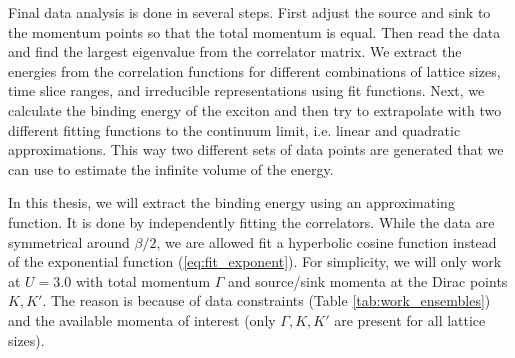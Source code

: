 
Final data analysis is done in several steps. First adjust the source and sink to the momentum points so that the total momentum is equal. Then read the data and find the largest eigenvalue from the correlator matrix. We extract the energies from the correlation functions for different combinations of lattice sizes, time slice ranges, and irreducible representations using fit functions. Next, we calculate the binding energy of the exciton and then try to extrapolate with two different fitting functions to the continuum limit, i.e. linear and quadratic approximations. This way two different sets of data points are generated that we can use to estimate the infinite volume of the energy.

In this thesis, we will extract the binding energy using an approximating function. It is done by independently fitting the correlators. While the data are symmetrical around $\beta/2$, we are allowed fit a hyperbolic cosine function instead of the exponential function (\ref{eq:fit_exponent}). For simplicity, we will only work at $U = 3.0$ with total momentum $\Gamma$ and source/sink momenta at the Dirac points $K, K'$. The reason is because of data constraints (Table \ref{tab:work_ensembles}) and the available momenta of interest (only $\Gamma, K, K'$ are present for all lattice sizes).

